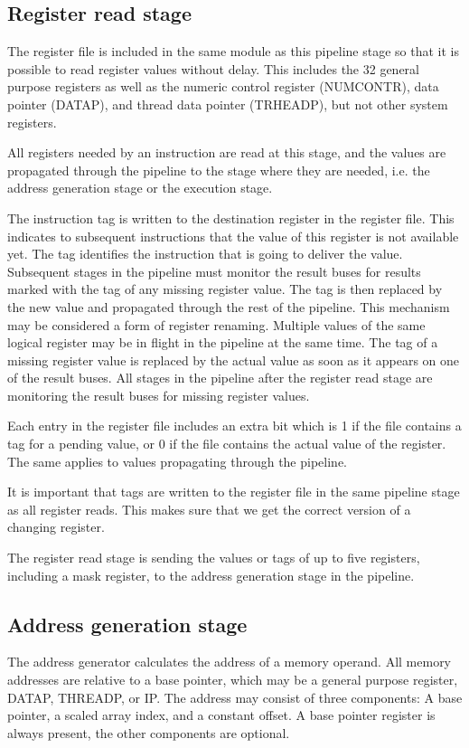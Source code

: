 \documentclass[11pt,a4paper,oneside,openright]{report}
\newcommand{\vv}{ \vspace{2mm} }   %
\begin{document}
\subsection{Register read stage}
The register file is included in the same module as this pipeline stage so that it is possible to read register values without delay. This includes the 32 general purpose registers as well as the numeric control register (NUMCONTR), data pointer (DATAP), and thread data pointer (TRHEADP), but not other system registers.
\vv

All registers needed by an instruction are read at this stage, and the values are propagated through the pipeline to the stage where they are needed, i.e. the address generation stage or the execution stage.
\vv

The instruction tag is written to the destination register in the register file. This indicates to subsequent instructions that the value of this register is not available yet. The tag identifies the instruction that is going to deliver the value. Subsequent stages in the pipeline must monitor the result buses for results marked with the tag of any missing register value. The tag is then replaced by the new value and propagated through the rest of the pipeline. 
This mechanism may be considered a form of register renaming. Multiple values of the same logical register may be in flight in the pipeline at the same time. The tag of a missing register value is replaced by the actual value as soon as it appears on one of the result buses. All stages in the pipeline after the register read stage are monitoring the result buses for missing register values.
\vv

Each entry in the register file includes an extra bit which is 1 if the file contains a tag for a pending value, or 0 if the file contains the actual value of the register. The same applies to values propagating through the pipeline.
\vv

It is important that tags are written to the register file in the same pipeline stage as all register reads. This makes sure that we get the correct version of a changing register.
\vv

The register read stage is sending the values or tags of up to five registers, including a mask register, to the address generation stage in the pipeline.
\vv


\subsection{Address generation stage}
The address generator calculates the address of a memory operand. 
All memory addresses are relative to a base pointer, which may be a general purpose register, DATAP, THREADP, or IP. 
The address may consist of three components: A base pointer, a scaled array index, and a constant offset. A base pointer register is always present, the other components are optional.
\vv
\end{document}

